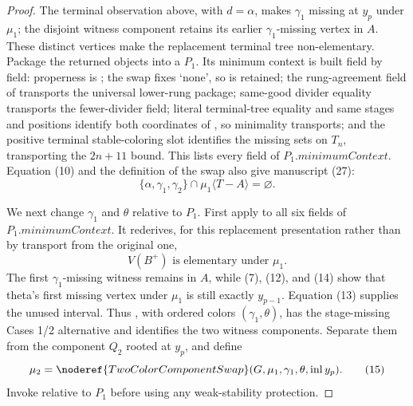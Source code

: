 \begin{proof}
The terminal observation above, with \(d=\alpha\), makes \(\gamma_1\)
missing at \(y_p\) under \(\mu_1\); the disjoint witness component retains
its earlier \(\gamma_1\)-missing vertex in \(A\).  These distinct vertices
make the replacement terminal tree non-elementary.  Package the returned
objects into a  \(P_1\).
Its minimum context is built field by field: properness is
; the swap fixes `none', so
 is retained; the rung-agreement field of
 transports the
universal lower-rung package; same-good divider equality transports the
fewer-divider field; literal terminal-tree equality and same stages and
positions identify both coordinates of
, so minimality transports; and
the positive terminal stable-coloring slot identifies the missing sets on
\(T_n\), transporting the \(2n+11\) bound.  This lists every field of
\(P_1.\mathit{minimumContext}\).  Equation (10) and the definition of the
swap also give manuscript (27):
\[
 \{\alpha,\gamma_1,\gamma_2\}\cap
       \mu_1\langle T-A\rangle=\varnothing.                   \tag{13}
\]

We next change \(\gamma_1\) and \(\theta\) relative to \(P_1\).  First
apply  to all six
fields of \(P_1.\mathit{minimumContext}\).  It rederives, for this
replacement presentation rather than by transport from the original one,
\[
                 V(B^+)\text{ is elementary under }\mu_1.     \tag{14}
\]
The first \(\gamma_1\)-missing witness remains in \(A\), while (7),
(12), and (14) show that theta's first missing vertex under \(\mu_1\) is
still exactly \(y_{p-1}\).  Equation (13) supplies the unused interval.
Thus , with ordered colors
\((\gamma_1,\theta)\), has the stage-missing Cases 1/2 alternative and
identifies the two witness components.  Separate them from the component
\(Q_2\) rooted at \(y_p\), and define
\[
 \mu_2=\noderef{TwoColorComponentSwap}
       (G,\mu_1,\gamma_1,\theta,\operatorname{inl}y_p).        \tag{15}
\]
Invoke  relative to \(P_1\) before using
any weak-stability protection.


\end{proof}
